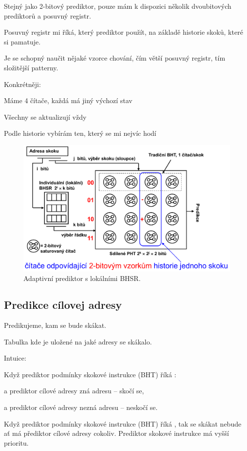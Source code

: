 \begin{compactitem}
    \item Stejný jako 2-bitový prediktor, pouze mám k dispozici několik dvoubitových prediktorů a posuvný registr.
    \item Posuvný registr mi říká, který prediktor použít, na základě historie skoků, které si pamatuje.
    \item Je se schopný naučit nějaké vzorce chování, čím větší posuvný registr, tím složitější patterny.
    \item Konkrétněji: \begin{compactitem}
        \item Máme 4 čítače, každá má jiný výchozí stav
        \item Všechny se aktualizují vždy
        \item Podle historie vybírám ten, který se mi nejvíc hodí
    \end{compactitem}

    \begin{figure}[H]
        \centering
        \includegraphics[width=0.85\linewidth]{prediktor_adaptivni.pdf}
        \caption{Adaptivní prediktor s lokálními BHSR.}
    \end{figure}
\end{compactitem}

\subsection{Predikce cílovej adresy}

\begin{compactitem}
    \item Predikujeme, kam se bude skákat.
    \item Tabulka kde je uložené na jaké adresy se skákalo.
    \item Intuice:
    \item Když prediktor podmínky skokové instrukce (BHT) říká : \begin{compactitem}
        \item a prediktor cílové adresy zná adresu -- skočí se,
        \item a prediktor cílové adresy nezná adresu -- neskočí se.
    \end{compactitem}
    \item Když prediktor podmínky skokové instrukce (BHT) říká , tak se skákat nebude ať má přediktor cílové adresy cokoliv. Prediktor skokové instrukce má vyšší prioritu.
\end{compactitem}

